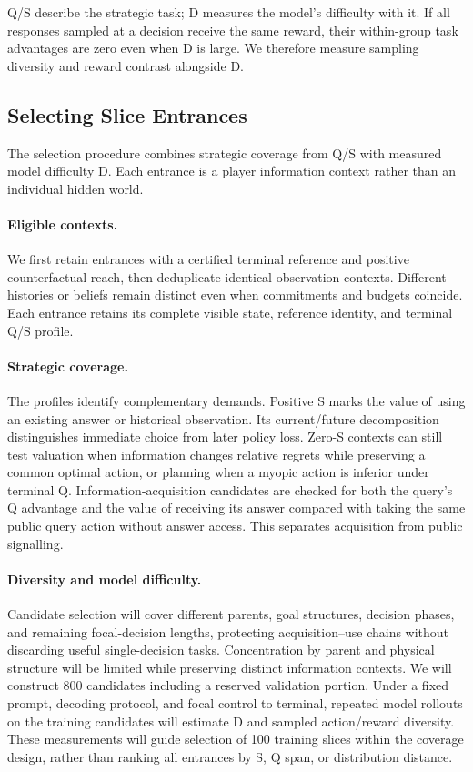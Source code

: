 \documentclass[11pt,a4paper]{article}
\begin{document}
Q/S describe the strategic task; D measures the model's difficulty with
it. If all responses sampled at a decision receive the same reward, their
within-group task advantages are zero even when D is large. We therefore
measure sampling diversity and reward contrast alongside D.

\subsection{Selecting Slice Entrances}
\label{sec:slice-selection}
The selection procedure combines strategic coverage from Q/S
with measured model difficulty D. Each entrance is a player information
context rather than an individual hidden world.

\paragraph{Eligible contexts.}
We first retain entrances with a certified terminal reference and positive
counterfactual reach, then deduplicate identical observation contexts.
Different histories or beliefs remain distinct even when commitments and
budgets coincide. Each entrance retains its complete visible state,
reference identity, and terminal Q/S profile.

\paragraph{Strategic coverage.}
The profiles identify complementary demands. Positive S marks the value of
using an existing answer or historical observation. Its current/future
decomposition distinguishes immediate choice from later policy loss.
Zero-S contexts can still test valuation when information changes relative
regrets while preserving a common optimal action, or planning when a
myopic action is inferior under terminal Q. Information-acquisition
candidates are checked for both the query's Q advantage and the value of
receiving its answer compared with taking the same public query action
without answer access. This separates acquisition from public signalling.

\paragraph{Diversity and model difficulty.}
Candidate selection will cover different parents, goal structures, decision
phases, and remaining focal-decision lengths, protecting acquisition--use
chains without discarding useful single-decision tasks. Concentration by
parent and physical structure will be limited while preserving distinct
information contexts. We will construct 800 candidates including a reserved
validation portion. Under a fixed prompt, decoding protocol, and focal
control to terminal, repeated model rollouts on the training candidates
will estimate D and sampled action/reward diversity. These measurements
will guide selection of 100 training slices within the coverage design,
rather than ranking all entrances by S, Q span, or distribution distance.
\end{document}

